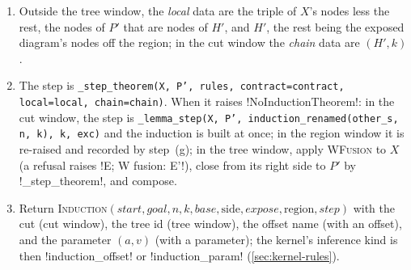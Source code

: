 \begin{algorithm}
\begin{enumerate}
\begin{enumerate}
\begin{itemize}
    \item Window \code!"cut"!: the copy is $P$'s nodes not in $H$, the region its complement. Find the cut region of the complement read as $H$; failing that, for each spider split of \py!_fan_split(P, copy)! find it in the split, the exposing theorem then being \py!_split_theorem!; failing that, when \py!copy_candidates! gives more than the copy, run \py!expose_cut! over the copy and the later candidates, the exposing theorem being \py!_steps_theorem! of the steps found. With none: \texttt{the residual is not the hypothesis through cut wires}. $X\gets$ \texttt{replace\_\allowbreak{}cut\_\allowbreak{}region(\allowbreak{}expose.\allowbreak{}rhs,\allowbreak{} cut,\allowbreak{} H,\allowbreak{} H')}.
    \item Window \code!"region"!: the region is $P$'s nodes that are $H$'s; $X\gets$ \texttt{replace\_\allowbreak{}region(\allowbreak{}P,\allowbreak{} region,\allowbreak{} H,\allowbreak{} H')}.
    \item Window \code!"tree"!: $P$ must hold exactly one fed !-box (\texttt{the peeled successor holds no single fed box}); its feeder $T$ fixes the region, the nodes of \py!unfed(P, T)!, and $X\gets$ \py!fed_replacement(P, T, H, H')!.
    \end{itemize}
  \item Outside the tree window, the \emph{local} data are the triple of $X$'s nodes less the rest, the nodes of $P'$ that are nodes of $H'$, and $H'$, the rest being the exposed diagram's nodes off the region; in the cut window the \emph{chain} data are $(H', k)$.
  \item The step is \texttt{\_\allowbreak{}step\_\allowbreak{}theorem(\allowbreak{}X,\allowbreak{} P',\allowbreak{} rules,\allowbreak{} contract=contract,\allowbreak{} local=local,\allowbreak{} chain=chain)}. When it raises \py!NoInductionTheorem!: in the cut window, the step is \texttt{\_\allowbreak{}lemma\_\allowbreak{}step(\allowbreak{}X,\allowbreak{} P',\allowbreak{} induction\_\allowbreak{}renamed(\allowbreak{}other\_\allowbreak{}s,\allowbreak{} n,\allowbreak{} k),\allowbreak{} k,\allowbreak{} exc)} and the induction is built at once; in the region window it is re-raised and recorded by step~(g); in the tree window, apply \textsc{WFusion} to $X$ (a refusal raises \code!E; W fusion: E'!), close from its right side to $P'$ by \py!_step_theorem!, and compose.
  \item Return \textsc{Induction}$(\textit{start},\textit{goal},n,k,\textit{base},\text{side},\textit{expose},\text{region},\textit{step})$ with the cut (cut window), the tree id (tree window), the offset name (with an offset), and the parameter $(a,v)$ (with a parameter); the kernel's inference kind is then \code!induction_offset! or \code!induction_param! (\cref{sec:kernel-rules}).

\end{enumerate}
\end{enumerate}
\end{algorithm}

